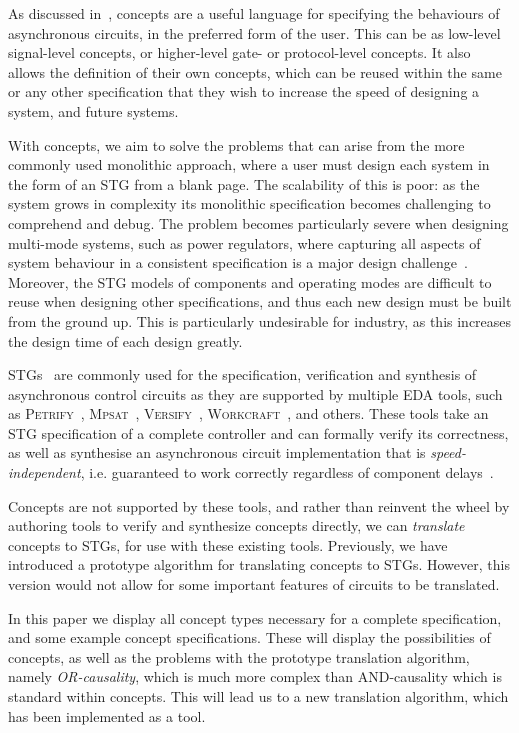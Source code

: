 \documentclass[british,conference,compsoc]{IEEEtran}
\newcommand{\noun}[1]{\textsc{#1}}
\begin{document}
As discussed in~\cite{2015_Beaumont_MEMOCODE}, concepts are a useful language for specifying
the behaviours of asynchronous circuits, in the preferred form of the user. This can be as low-level 
signal-level concepts, or higher-level gate- or protocol-level concepts. It also allows the definition of 
their own concepts, which can be reused within the same or any other specification that they wish
to increase the speed of designing a system, and future systems. 

With concepts, we aim to solve the problems that can arise from the more commonly used
monolithic approach, where a user must design each system in the form of an STG from a blank page. 
The scalability of this is poor: as the system grows in complexity its monolithic specification becomes 
challenging to comprehend and debug. The problem becomes particularly severe when designing 
multi-mode systems, such as power regulators, where capturing all aspects of system behaviour in a
consistent specification is a major design challenge~\cite{2014_sokolov_ftfc}\cite{sokolov2015design}. 
Moreover, the STG models of components and  operating modes are difficult to reuse when designing 
other specifications, and thus each new design must be built from the ground up. This is particularly 
undesirable for industry, as this increases the design time of each design greatly. 

STGs~\cite{Chu_1987_phd}\cite{Rosenblum_1985_tpn}
are commonly used for the specification,
verification and synthesis of asynchronous control circuits as they are
supported by multiple EDA tools, such as \noun{Petrify}~\cite{Cortadella},
\noun{Mpsat}~\cite{khomenko2004detecting}, \noun{Versify}~\cite{i1997formal},
\noun{Workcraft}~\cite{2007_poliakov_workcraft}\cite{Workcraft_website}, and
others.
These tools take an STG specification of a complete controller and can
formally verify its correctness, as well as synthesise an asynchronous
circuit implementation that is \emph{speed-independent}, i.e. guaranteed
to work correctly regardless of component delays~\cite{Muller_1959_ts}.

Concepts are not supported by these tools, and rather than reinvent the wheel by authoring tools
to verify and synthesize concepts directly, we can \emph{translate} concepts to STGs, for use with 
these existing tools. Previously, we have introduced a prototype algorithm for translating concepts
to STGs. However, this version would not allow for some important features of circuits to be
translated. 

In this paper we display all concept types necessary for a complete specification, and some 
example concept specifications. These will display the possibilities of concepts, as well as the 
problems with the prototype translation algorithm, namely \emph{OR-causality}, which is 
much more complex than AND-causality which is standard within concepts. 
This will lead us to a new translation algorithm, which has been implemented as a tool. 
\end{document}

